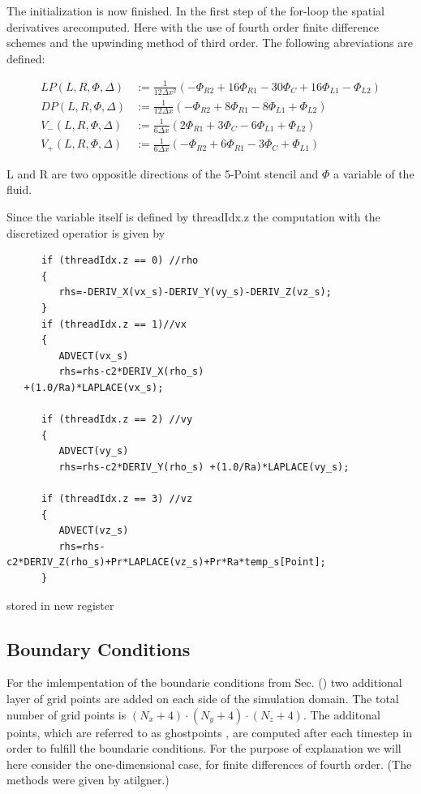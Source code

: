 The initialization is now finished. In the first step of the for-loop the spatial derivatives arecomputed.
Here with the  use of fourth order finite difference schemes and the upwinding method of third order.
The following abreviations are defined:

\begin{align}
    LP (L, R, \Phi, \Delta)  &:=  \frac{1}{12\Delta x^2} \left(-\Phi_{R2} + 16\Phi_{R1} - 30\Phi_C +16\Phi_{L1} - \Phi_{L2} \right)\\
    DP (L, R, \Phi, \Delta)  &:=  \frac{1}{12\Delta x}   \left(-\Phi_{R2} + 8\Phi_{R1}  -8\Phi_{L1} + \Phi_{L2} \right)\\
    V_-(L, R, \Phi, \Delta)  &:=  \frac{1}{6\Delta x}  \left( 2\Phi_{R1} + 3\Phi_C  - 6\Phi_{L1} + \Phi_{L2}  \right)\\
    V_+(L, R, \Phi, \Delta)  &:=  \frac{1}{6\Delta x}  \left( -\Phi_{R2} + 6\Phi_{R1}  - 3\Phi_{C} + \Phi_{L1}  \right)
\end{align}

L and R are two oppositle directions of the 5-Point stencil and $\Phi$ a variable of the fluid.

\clearpage

Since the variable itself is defined by threadIdx.z the computation with the discretized operatior is given by

\begin{verbatim}
      if (threadIdx.z == 0) //rho
      {
         rhs=-DERIV_X(vx_s)-DERIV_Y(vy_s)-DERIV_Z(vz_s);
      }
      if (threadIdx.z == 1)//vx
      {
         ADVECT(vx_s)
         rhs=rhs-c2*DERIV_X(rho_s)
   +(1.0/Ra)*LAPLACE(vx_s);

      if (threadIdx.z == 2) //vy
      {
         ADVECT(vy_s)
         rhs=rhs-c2*DERIV_Y(rho_s) +(1.0/Ra)*LAPLACE(vy_s);

      if (threadIdx.z == 3) //vz
      {
         ADVECT(vz_s)
         rhs=rhs-c2*DERIV_Z(rho_s)+Pr*LAPLACE(vz_s)+Pr*Ra*temp_s[Point];
      }
\end{verbatim}

stored in new register

\subsection{Boundary Conditions}

For the imlempentation of the boundarie conditions from Sec. () two additional layer of grid points
are added on each side of the simulation domain.
The total number of grid points is ${(N_x + 4)\cdot(N_y + 4)\cdot(N_z + 4)}$.
The additonal points, which are referred to as ghostpoints \citep{ctie},
are computed after each timestep in order to fulfill the boundarie conditions.
For the purpose of explanation we will here consider the one-dimensional case,
for finite differences of fourth order. (The methods were given by atilgner.)


